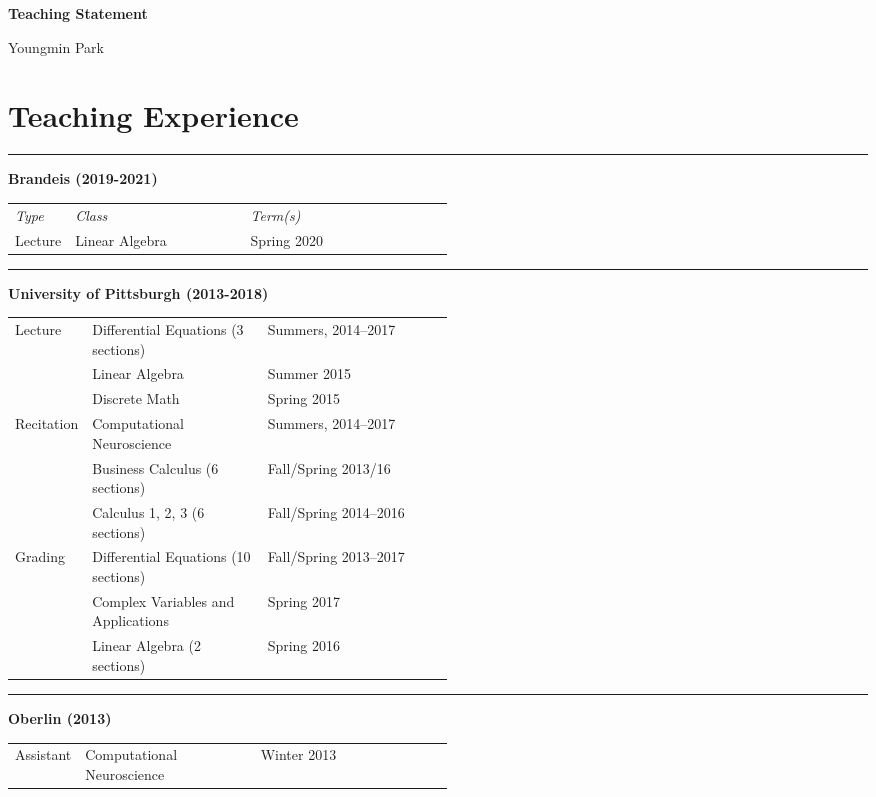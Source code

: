 \documentclass[a4paper,11pt]{article}
\begin{document}
\begin{center}
\Large \textbf{Teaching Statement}

\Large Youngmin Park
\end{center}

\section{Teaching Experience}

\noindent\rule{15cm}{0.4pt}

\textbf{Brandeis (2019-2021)}

\begin{tabular}{p{0.11\linewidth}p{0.4\linewidth}p{.3\linewidth}}
	\textit{Type} & \textit{Class} & \textit{Term(s)}\\
	{Lecture} & Linear Algebra & Spring 2020
\end{tabular}

\noindent\rule{15cm}{0.4pt}

\textbf{University of Pittsburgh (2013-2018)}

\begin{tabular}{p{0.11\linewidth}p{0.4\linewidth}p{.3\linewidth}}
	 Lecture & Differential Equations (3 sections) & Summers, 2014--2017\\
	 & Linear Algebra & Summer 2015 \\
	 & Discrete Math & Spring 2015 \\
	 Recitation & Computational Neuroscience & Summers, 2014--2017 \\
	  & Business Calculus (6 sections) & Fall/Spring 2013/16\\
	  & Calculus 1, 2, 3 (6 sections) & Fall/Spring 2014--2016\\
	 Grading & Differential Equations (10 sections) & Fall/Spring 2013--2017  \\
	 & Complex Variables and Applications & Spring 2017 \\
	 & Linear Algebra (2 sections) & Spring 2016
\end{tabular}

\noindent\rule{15cm}{0.4pt}

\textbf{Oberlin (2013)}

\begin{tabular}{p{0.11\linewidth}p{0.4\linewidth}p{.2\linewidth}}
	 Assistant & Computational Neuroscience  & Winter 2013 
\end{tabular}

\vspace{1cm}
\end{document}
